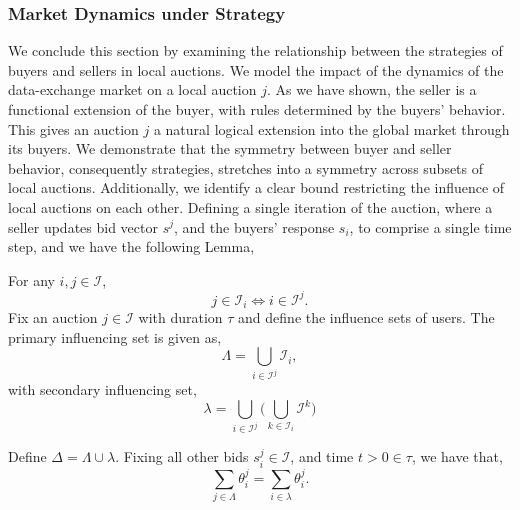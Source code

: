 \documentclass[sigconf, anonymous]{acmart}
\newcommand{\mcI}{\mathcal{I}}
\theoremstyle{definition}
\begin{document}
\subsubsection{Market Dynamics under Strategy}

We conclude this section by examining the relationship between the strategies of buyers and
sellers in local auctions. We model the impact of the dynamics of the
data-exchange market on a local auction $j$. As we have shown, the seller
is a functional extension of the buyer, with rules determined by the buyers'
behavior. This gives an auction $j$ a natural logical extension into the
global market through its buyers. We demonstrate that the symmetry between
buyer and seller behavior, consequently strategies, stretches into a symmetry across subsets of local
auctions. Additionally, we identify a clear bound restricting the influence of
local auctions on each other. Defining a single iteration of the auction, where a seller updates bid vector
$s^j$, and the buyers' response $s_i$, to comprise a single time step, and we have the following Lemma,
{
\label{userunion}
For any $i,j\in \mcI$, 
\begin{equation}\label{jtoi}
j\in\mcI_i \Leftrightarrow i\in\mcI^j.
\end{equation}
Fix an auction $j\in\mcI$ with duration $\tau$ and define the influence sets of users. 
The primary influencing set is given as,
\begin{equation}\label{lambda}
    \Lambda = \displaystyle\bigcup_{i\in\mcI^j} \mcI_i,
\end{equation}
with secondary influencing set,
\begin{equation}\label{llambda}
    \lambda = \bigcup_{i\in\mcI^j} \bigg(\bigcup_{k\in\mcI_i} \mcI^k \bigg)
\end{equation}
\iffalse
(THE SELLERS ALL THE BUYERS IN $j$ HAVE IN COMMON! i.e. $j$ AND...)
\begin{equation}%
    \Lambda = \displaystyle\bigcap_{i\in\mcI^j} \mcI_i,
\end{equation}
(THE COLLECTION OF BUYERS FROM EACH $i$ THAT ARE COMMON ACROSS ALL THE $i$'s SELLER
POOLS)
\begin{equation}%
    \lambda = \bigcup_{i\in\mcI^j} \bigg(\bigcap_{k\in\mcI_i} \mcI^k \bigg)
\end{equation}
\fi
Define $\Delta = \Lambda \cup \lambda$.
Fixing all other bids $s_i^j \in \mcI$, and time $t>0\in\tau$, we have that,
\begin{equation}\label{union-eq}
    \displaystyle\sum_{j\in\Lambda} \theta_i^j = \sum_{i\in\lambda} \theta_i^j.
\end{equation}
}\\
\end{document}
